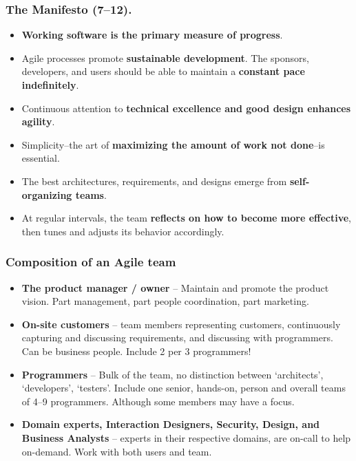 \documentclass{beamer} %
\newcommand\emc[1]{\textcolor{midred}{\textbf{#1}}}
\begin{document}
\begin{frame}
\frametitle{The Manifesto (7--12).}

\begin{itemize}


\item \emc{Working software is the primary measure of progress}.

\item Agile processes promote \emc{sustainable development}. 
The sponsors, developers, and users should be able 
to maintain a \emc{constant pace indefinitely}.

\item Continuous attention to \emc{technical excellence 
and good design enhances agility}.

\item Simplicity--the art of \emc{maximizing the amount 
of work not done}--is essential.

\item The best architectures, requirements, and designs 
emerge from \emc{self-organizing teams}.

\item At regular intervals, the team \emc{reflects on how 
to become more effective}, then tunes and adjusts 
its behavior accordingly.

\end{itemize}

\end{frame}


\begin{frame}

\frametitle{Composition of an Agile team}

\begin{itemize}
\item \emc{The product manager / owner} -- Maintain and promote the product vision. Part management, part people coordination, part marketing.

\item \emc{On-site customers} -- team members representing customers, continuously capturing and discussing requirements, and discussing with programmers. \\ Can be business people. Include 2 per 3 programmers!

\item \emc{Programmers} -- Bulk of the team, no distinction between `architects', `developers', `testers'. Include one senior, hands-on, person and overall teams of 4--9 programmers. Although some members may have a focus.

\item \emc{Domain experts, Interaction Designers, Security, Design, and Business Analysts} -- experts in their respective domains, are on-call to help on-demand. Work with both users and team.

\end{itemize}

\end{frame}
\end{document}
